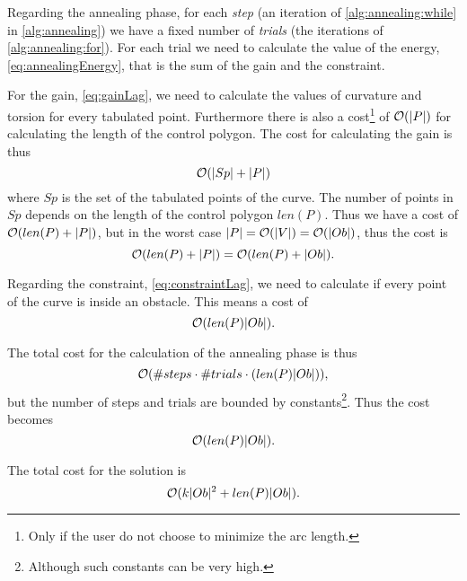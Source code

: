 \documentclass[dissertation.tex]{subfiles}
\begin{document}
Regarding the annealing phase, for each \emph{step} (an
iteration of \cref{alg:annealing:while} in \cref{alg:annealing}) we
have a fixed number of \emph{trials} (the iterations of \cref{alg:annealing:for}). For each trial we need to
calculate the value of the energy, \cref{eq:annealingEnergy}, that is
the sum of the gain and the constraint.

For the gain, \cref{eq:gainLag}, we need to calculate the values of
curvature and torsion for every tabulated point. Furthermore there is
also a cost\footnote{Only if
  the user do not choose to minimize the arc length.} of
$\mathcal{O}(|P|)$ for
calculating the length of the control polygon. The cost for
calculating the gain is thus
\begin{equation*}
  \mathcal{O}(|Sp|+|P|)
\end{equation*}
where $Sp$ is the set of the tabulated points of the curve. The number
of points in $Sp$ depends on the length of the control polygon
$len(P)$. Thus
we have a cost of $\mathcal{O}(len(P)+|P|)$, but in the worst case
$|P|=\mathcal{O}(|V|)=\mathcal{O}(|Ob|)$, thus the cost is
\newcommand{\eqCostGain}{\ensuremath{\bigO(len(P)+|P|)=\bigO(len(P)+|Ob|)}}
\begin{equation}
  \label{eq:costGain}
  \eqCostGain.
\end{equation}

Regarding the constraint, \cref{eq:constraintLag}, we need to calculate if
every point 
of the curve is inside an obstacle. This means a cost of
\newcommand{\eqCostConstraint}{\ensuremath{\bigO(len(P)|Ob|)}}
\begin{equation}
  \label{eq:costConstraint}
  \eqCostConstraint.
\end{equation}

The total cost for the calculation of the annealing phase is thus
\begin{equation*}
\mathcal{O}(\#steps\cdot\#trials\cdot(len(P)|Ob|)),
\end{equation*}
but the number of steps and trials are bounded by
constants\footnote{Although such constants can be very high.}. Thus
the cost becomes
\newcommand{\eqCostAnneal}{\ensuremath{\bigO(len(P)|Ob|)}}
\begin{equation}
  \label{eq:costAnneal}
  \eqCostAnneal.
\end{equation}

The total cost for the solution is
\newcommand{\eqCostTotalThree}{\ensuremath{\bigO(k|Ob|^2+len(P)|Ob|)}}
\begin{equation}
  \label{eq:costTotalThree}
  \eqCostTotalThree.
\end{equation}
\end{document}
